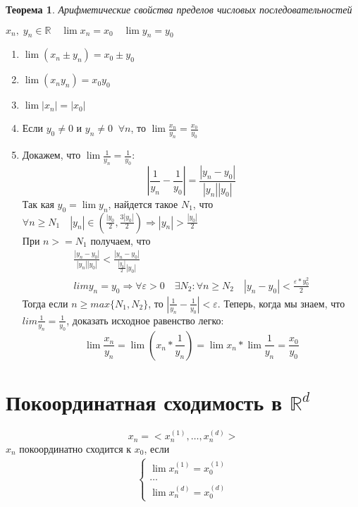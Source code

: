 \documentclass[12pt,letterpaper]{report}
\makeatletter
\newtheorem*{theorem-non}{Теорема}
\theoremstyle{definition}
\renewenvironment{proof}[1][\proofname]{%
   \par\pushQED{\qed}\normalfont%
   \topsep6\p@\@plus6\p@\relax
   \trivlist\item[\hskip\labelsep\bfseries#1\@addpunct{.}]%
   \ignorespaces
}{%
   \popQED\endtrivlist\@endpefalse
}
\makeatother
\begin{document}
    \begin{theorem-non} Арифметические свойства пределов числовых последовательностей \end{theorem-non}
    $x_n,\; y_n \in \mathbb{R} \quad \lim x_n = x_0 \quad \lim y_n = y_0$
    \begin{enumerate}
        \item $\lim (x_n \pm y_n) = x_0 \pm y_0$
        \item $\lim (x_ny_n) = x_0y_0$
        \item $\lim |x_n| = |x_0|$
        \item Если $y_0 \neq 0$ и $y_n \neq 0\;\; \forall n$, то $\lim \frac{x_n}{y_n} = \frac{x_0}{y_0}$
        \begin{proof}
            Докажем, что $\lim\frac{1}{y_n} = \frac{1}{y_0}$:
            \[ | \frac{1}{y_n} - \frac{1}{y_0} | = \frac{|y_n - y_0|}{|y_n||y_0|} \]
            Так кая $y_0 = \lim y_n$, найдется такое $N_1$, что $\forall n \geqslant N_1 \quad |y_n| \in (\frac{|y_0}{2}, \frac{3|y_0|}{2}) \Rightarrow |y_n| > \frac{|y_0|}{2}$ \\
            При $n >= N_1$ получаем, что
            \begin{gather*}
                \frac{|y_n - y_0|}{|y_n||y_0|} < \frac{|y_n - y_0|}{\frac{|y_0|}{2}|y_0|} \\
                lim y_n = y_0 \Rightarrow \forall \varepsilon > 0 \quad \exists N_2 : \forall n \geqslant N_2 \quad |y_n - y_0| < \frac{\varepsilon*y_0^2}{2}
            \end{gather*}
            Тогда если $n \geqslant max\{N_1, N_2\}$, то $|\frac{1}{y_n} - \frac{1}{y_0}| < \varepsilon$.
            Теперь, когда мы знаем, что $lim\frac{1}{y_n} = \frac{1}{y_0}$, доказать исходное равенство легко:
            \[ \lim \frac{x_n}{y_n} = \lim (x_n * \frac{1}{y_n}) = \lim x_n * \lim \frac{1}{y_n} = \frac{x_0}{y_0} \]
        \end{proof}
    \end{enumerate}
    
    \section{Покоординатная сходимость в $\mathbb{R}^d$}
    \[ x_n = <x_n^{(1)}, \dots, x_n^{(d)}> \]
    $x_n$ покоординатно сходится к $x_0$, если \\
    \begin{gather*}
        \begin{cases}
            \lim x_n^{(1)} = x_0^{(1)} \\
            \dots \\
            \lim x_n^{(d)} = x_0^{(d)}
        \end{cases}
    \end{gather*}
    
\end{document}

